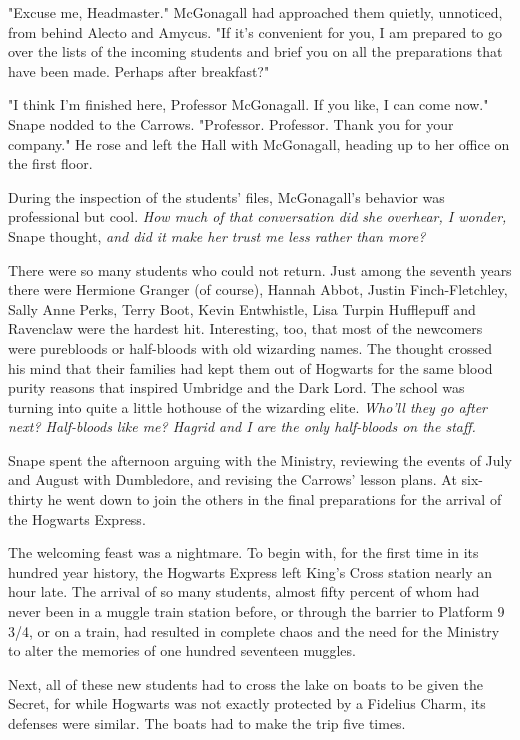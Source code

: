 "Excuse me, Headmaster." McGonagall had approached them quietly, unnoticed, from behind Alecto and Amycus. "If it's convenient for you, I am prepared to go over the lists of the incoming students and brief you on all the preparations that have been made. Perhaps after breakfast?"

"I think I'm finished here, Professor McGonagall. If you like, I can come now." Snape nodded to the Carrows. "Professor. Professor. Thank you for your company." He rose and left the Hall with McGonagall, heading up to her office on the first floor.

During the inspection of the students' files, McGonagall's behavior was professional but cool. \emph{How much of that conversation did she overhear, I wonder,} Snape thought, \emph{and did it make her trust me less rather than more?}

There were so many students who could not return. Just among the seventh years there were Hermione Granger (of course), Hannah Abbot, Justin Finch-Fletchley, Sally Anne Perks, Terry Boot, Kevin Entwhistle, Lisa Turpin{\el} Hufflepuff and Ravenclaw were the hardest hit. Interesting, too, that most of the newcomers were purebloods or half-bloods with old wizarding names. The thought crossed his mind that their families had kept them out of Hogwarts for the same blood purity reasons that inspired Umbridge and the Dark Lord. The school was turning into quite a little hothouse of the wizarding elite. \emph{Who'll they go after next? Half-bloods like me? Hagrid and I are the only half-bloods on the staff.}

Snape spent the afternoon arguing with the Ministry, reviewing the events of July and August with Dumbledore, and revising the Carrows' lesson plans. At six-thirty he went down to join the others in the final preparations for the arrival of the Hogwarts Express.

The welcoming feast was a nightmare. To begin with, for the first time in its hundred year history, the Hogwarts Express left King's Cross station nearly an hour late. The arrival of so many students, almost fifty percent of whom had never been in a muggle train station before, or through the barrier to Platform 9 3/4, or on a train, had resulted in complete chaos and the need for the Ministry to alter the memories of one hundred seventeen muggles.

Next, all of these new students had to cross the lake on boats to be given the Secret, for while Hogwarts was not exactly protected by a Fidelius Charm, its defenses were similar. The boats had to make the trip five times.

